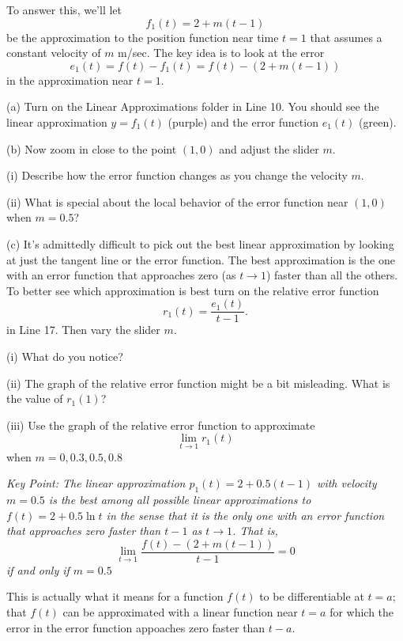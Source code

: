 \documentclass{ximera}
\begin{document}
To answer this, we'll let
\[
   f_1(t) = 2 + m(t-1)
\]
be the approximation to the position function near time $t=1$ that assumes a constant velocity of $m$ m/sec. The key idea is to look at the error
\[
    e_1(t) = f(t) - f_1(t) = f(t) - (2 + m(t-1))
\]
in the approximation near $t=1$.

\begin{exploration}\label{Exp3:Comp}
(a) Turn on the Linear Approximations folder in Line 10. You should see the linear approximation $y=f_1(t)$ (purple) and the error function $e_1(t)$ (green).

(b) Now zoom in close to the point $(1,0)$ and adjust the slider $m$.
\begin{question} \label{Qfdsg677}
(i) Describe how the error function changes as you change the velocity $m$.

(ii) What is special about the local behavior of the error function near $(1,0)$ when $m=0.5$?
\end{question}

(c) It's admittedly difficult to pick out the best linear approximation by looking at just the tangent line or the error function. The best approximation is the one with an error function that approaches zero (as $t\to 1$) faster than all the others. To better see which approximation is best turn on the relative error function
\[
    r_1 (t) = \frac{e_1(t)}{t-1} .
\]
in Line 17. Then vary the slider $m$.

\begin{question} \label{Q3435rgg}
(i) What do you notice? 

(ii) The graph of the relative error function might be a bit misleading. What is the value of $r_1(1)$?

(iii) Use the graph of the relative error function to approximate 
\[
    \lim_{t\to 1}r_1(t) 
\]
when $m=0, 0.3, 0.5, 0.8$
\end{question}


\it{Key Point:} The linear approximation $p_1(t)=2+0.5(t-1)$ with velocity $m=0.5$ is the best among all possible linear approximations to $f(t)=2+0.5\ln t$ in the sense that it is the \emph{only} one with an error function that approaches zero faster than $t-1$ as $t\to 1$. That is,
\[
          \lim_{t\to 1} \frac{f(t) - (2 + m(t-1))}{t-1} = 0
\]
if and only if $m=0.5$

This is actually what it means for a function $f(t)$ to be differentiable at $t=a$; that $f(t)$ can be approximated with a linear function near $t=a$ for which the error in the error function appoaches zero faster than $t-a$. 




\end{exploration}
\end{document}
